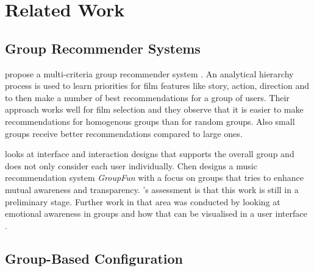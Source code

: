 \chapter{Related Work}
\label{ch:Related_Work}

\section{Group Recommender Systems}
\label{sec:Related_Work:GroupRecommender}

\begin{description}[style=unboxed, leftmargin=0cm, font=\normalfont]
    \item[\citeauthor{choudharyMulticriteriaGroupRecommender2020}] propose a multi-criteria group recommender system \cite{choudharyMulticriteriaGroupRecommender2020}. An analytical hierarchy process is used to learn priorities for film features like story, action, direction and to then make a number of best recommendations for a group of users. Their approach works well for film selection and they observe that it is easier to make recommendations for homogenous groups than for random groups. Also small groups receive better recommendations compared to large ones.

    \item[\citeauthor{chenInterfaceInteractionDesign2011}] looks at interface and interaction designs that supports the overall group and does not only consider each user individually. Chen designs a music recommendation system \emph{GroupFun} with a focus on groups that tries to enhance mutual awareness and transparency. \citeauthor{chenInterfaceInteractionDesign2011}'s assessment is that this work is still in a preliminary stage\cite{chenInterfaceInteractionDesign2011}. Further work in that area was conducted by \citeauthor{chenEmpatheticonsDesigningEmotion2014} looking at emotional awareness in groups and how that can be visualised in a user interface \cite{chenEmpatheticonsDesigningEmotion2014}. 
\end{description}

\section{Group-Based Configuration}
\label{sec:Related_Work:GroupBasedConfiguration}

